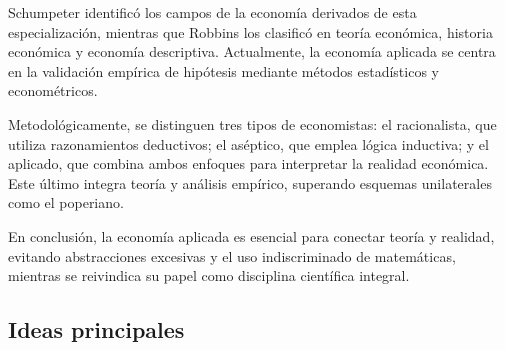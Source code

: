 \documentclass[12pt]{book} %
\begin{document}
Schumpeter identificó los campos de la economía derivados de esta
especialización, mientras que Robbins los clasificó en teoría económica,
historia económica y economía descriptiva. Actualmente, la economía
aplicada se centra en la validación empírica de hipótesis mediante
métodos estadísticos y econométricos.

Metodológicamente, se distinguen tres tipos de economistas: el
racionalista, que utiliza razonamientos deductivos; el aséptico, que
emplea lógica inductiva; y el aplicado, que combina ambos enfoques para
interpretar la realidad económica. Este último integra teoría y análisis
empírico, superando esquemas unilaterales como el poperiano.

En conclusión, la economía aplicada es esencial para conectar teoría y
realidad, evitando abstracciones excesivas y el uso indiscriminado de
matemáticas, mientras se reivindica su papel como disciplina científica
integral.

\hypertarget{ideas-principales}{%
\subsection{Ideas principales}\label{ideas-principales}}
\end{document}
